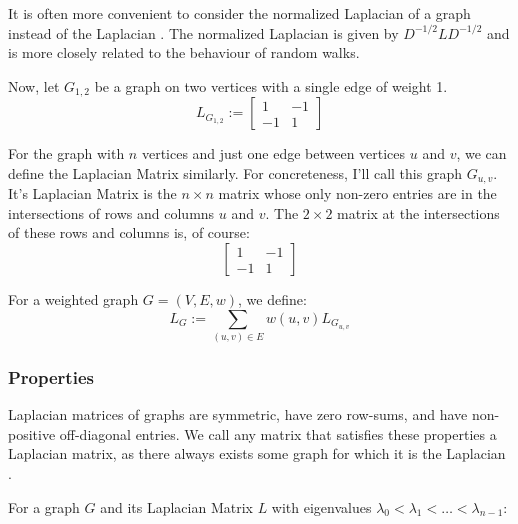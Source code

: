 It is often more convenient to consider the normalized Laplacian of a graph
instead of the Laplacian \cite{Spielman:2010}. The normalized Laplacian is given
by $D^{-1/2}LD^{-1/2}$ and is more closely related to the behaviour of random
walks.

Now, let $G_{1,2}$ be a graph on two vertices with a single edge of weight 1.
\begin{equation}
    L_{G_{1,2}} :=
        \begin{bmatrix}
            1 & -1\\
            -1 & 1
        \end{bmatrix}
\end{equation}

For the graph with $n$ vertices and just one edge between vertices $u$ and $v$,
we can define the Laplacian Matrix similarly. For concreteness, I'll call this
graph $G_{u,v}$. It's Laplacian Matrix is the $n \times n$ matrix whose only
non-zero entries are in the intersections of rows and columns $u$ and $v$. The
$2 \times 2$ matrix at the intersections of these rows and columns is, of
course:
\begin{equation}
    \begin{bmatrix}
        1 & -1\\
        -1 & 1
    \end{bmatrix}
\end{equation}

For a weighted graph $G = (V,E,w)$, we define:
\begin{equation}
    L_G := \sum_{(u,v) \in E} w(u,v)L_{G_{u,v}}
\end{equation}

\subsubsection{Properties}
\label{laplacianMatrices:properties}
Laplacian matrices of graphs are symmetric, have zero row-sums, and have
non-positive off-diagonal entries. We call any matrix that satisfies these
properties a Laplacian matrix, as there always exists some graph for which it is
the Laplacian \cite{Spielman:2010}.

For a graph $G$ and its Laplacian Matrix $L$ with eigenvalues
$\lambda_0<\lambda_1<\ldots<\lambda_{n-1}$:

